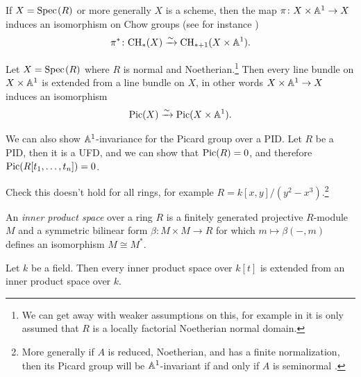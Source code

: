 \documentclass[11pt,openany]{book}
\begin{document}
\begin{example} If $X = \text{Spec}\hspace{0.1em}(R)$ or more generally $X$ is a scheme, then the map $\pi \colon X \times \mathbb{A}^1 \to X$ induces an isomorphism on Chow groups (see for instance \cite[3.3]{Fulton})
\begin{align*}
    \pi^\ast \colon \mathrm{CH}_\ast(X) \xrightarrow{\sim} \mathrm{CH}_{\ast+1}(X \times \mathbb{A}^1).
\end{align*}
\end{example}

\begin{example} Let $X = \text{Spec}\hspace{0.1em}(R)$ where $R$ is normal and Noetherian.\footnote{%
We can get away with weaker assumptions on this, for example in \cite[3.7.13]{Asok-A1AG} it is only assumed that $R$ is a locally factorial Noetherian normal domain.
}
Then every line bundle on $X \times \mathbb{A}^1$ is extended from a line bundle on $X$, in other words $X \times \mathbb{A}^1 \to X$ induces an isomorphism
\begin{align*}
    \mathrm{Pic}(X) \xrightarrow{\sim} \mathrm{Pic}(X \times\mathbb{A}^1).
\end{align*}
\end{example}

\begin{example} We can also show $\mathbb{A}^1$-invariance for the Picard group over a PID. Let $R$ be a PID, then it is a UFD, and we can show that $\mathrm{Pic}(R) = 0$, and therefore $\mathrm{Pic}(R[t_1, \ldots, t_n])=0$.
\end{example}




\begin{example} \cite[3.7.1.5]{Asok-A1AG}
Check this doesn't hold for all rings, for example $R = k[x,y]/(y^2-x^3)$.\footnote{%
More generally if $A$ is reduced, Noetherian, and has a finite normalization, then its Picard group will be $\mathbb{A}^1$-invariant if and only if $A$ is seminormal \cite[3.6]{Traverso}.
}
\end{example}

\begin{definition} An \textit{inner product space} over a ring $R$ is a finitely generated projective $R$-module $M$ and a symmetric bilinear form $\beta \colon M \times M \to R$ for which $m \mapsto \beta(-,m)$ defines an isomorphism $M \cong M^\ast$.
\end{definition}


\begin{theorem} Let $k$ be a field. Then every inner product space over $k[t]$ is extended from an inner product space over $k$.
\end{theorem}
\end{document}
